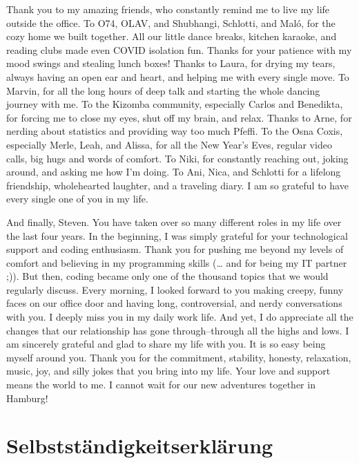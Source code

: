 \documentclass[
]{scrbook}
\begin{document}
Thank you to my amazing friends, who constantly remind me to live my life outside the office. To O74, OLAV, and Shubhangi, Schlotti, and Maló, for the cozy home we built together. All our little dance breaks, kitchen karaoke, and reading clubs made even COVID isolation fun. Thanks for your patience with my mood swings and stealing lunch boxes! Thanks to Laura, for drying my tears, always having an open ear and heart, and helping me with every single move. To Marvin, for all the long hours of deep talk and starting the whole dancing journey with me. To the Kizomba community, especially Carlos and Benedikta, for forcing me to close my eyes, shut off my brain, and relax. Thanks to Arne, for nerding about statistics and providing way too much Pfeffi. To the Osna Coxis, especially Merle, Leah, and Alissa, for all the New Year's Eves, regular video calls, big hugs and words of comfort. To Niki, for constantly reaching out, joking around, and asking me how I'm doing. To Ani, Nica, and Schlotti for a lifelong friendship, wholehearted laughter, and a traveling diary. I am so grateful to have every single one of you in my life.

And finally, Steven. You have taken over so many different roles in my life over the last four years. In the beginning, I was simply grateful for your technological support and coding enthusiasm. Thank you for pushing me beyond my levels of comfort and believing in my programming skills (\ldots{} and for being my IT partner ;)). But then, coding became only one of the thousand topics that we would regularly discuss. Every morning, I looked forward to you making creepy, funny faces on our office door and having long, controversial, and nerdy conversations with you. I deeply miss you in my daily work life. And yet, I do appreciate all the changes that our relationship has gone through\thinspace --\thinspace through all the highs and lows. I am sincerely grateful and glad to share my life with you. It is so easy being myself around you. Thank you for the commitment, stability, honesty, relaxation, music, joy, and silly jokes that you bring into my life. Your love and support means the world to me. I cannot wait for our new adventures together in Hamburg!

\chapter*{Selbstständigkeitserklärung}\label{selbststaendigkeit}
\end{document}
